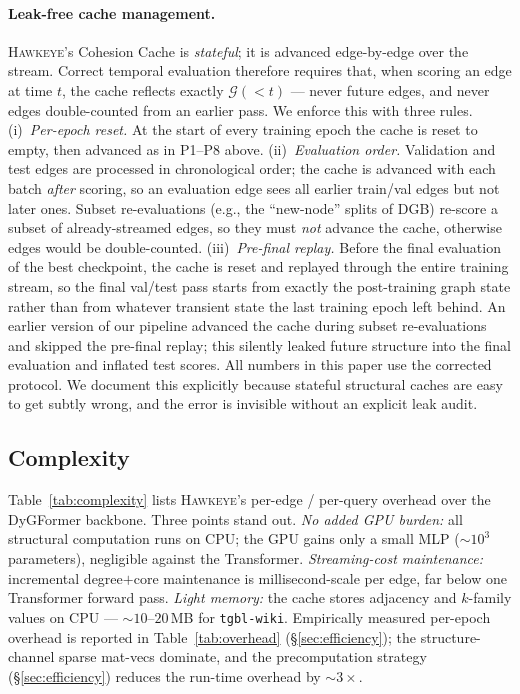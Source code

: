 \documentclass[sigconf,nonacm,review]{acmart}
\newcommand{\method}{\textsc{Hawkeye}\xspace}
\newcommand{\eg}{e.g.,\xspace}
\newcommand{\Gcal}{\mathcal{G}}
\begin{document}
\paragraph{Leak-free cache management.}
\label{sec:leakfree}
\method's Cohesion Cache is \emph{stateful}; it is advanced edge-by-edge
over the stream. Correct temporal evaluation therefore requires that, when
scoring an edge at time $t$, the cache reflects exactly $\Gcal(<t)$ --- never
future edges, and never edges double-counted from an earlier pass. We
enforce this with three rules.
(i)~\emph{Per-epoch reset.}
At the start of every training epoch the cache is reset to empty, then
advanced as in P1--P8 above.
(ii)~\emph{Evaluation order.} Validation and test edges are processed in
chronological order; the cache is advanced with each batch \emph{after}
scoring, so an evaluation edge sees all earlier train/val edges but not
later ones. Subset re-evaluations (\eg{} the ``new-node'' splits of DGB)
re-score a subset of already-streamed edges, so they must \emph{not}
advance the cache, otherwise edges would be double-counted.
(iii)~\emph{Pre-final replay.} Before the final evaluation of the best
checkpoint, the cache is reset and replayed through the entire training
stream, so the final val/test pass starts from exactly the
post-training graph state rather than from whatever transient state the
last training epoch left behind. An earlier version of our pipeline
advanced the cache during subset re-evaluations and skipped the pre-final
replay; this silently leaked future structure into the final evaluation
and inflated test scores. All numbers in this paper use the corrected
protocol. We document this explicitly because stateful structural caches
are easy to get subtly wrong, and the error is invisible without an
explicit leak audit.

\subsection{Complexity}
Table~\ref{tab:complexity} lists \method's per-edge / per-query overhead over
the DyGFormer backbone. Three points stand out. \emph{No added GPU burden:} all
structural computation runs on CPU; the GPU gains only a small MLP
($\sim\!10^3$ parameters), negligible against the Transformer.
\emph{Streaming-cost maintenance:} incremental degree$+$core maintenance is
millisecond-scale per edge, far below one Transformer forward pass.
\emph{Light memory:} the cache stores adjacency and $k$-family values on CPU
--- $\sim\!10$--$20$\,MB for \texttt{tgbl-wiki}.
Empirically measured per-epoch overhead is reported in
Table~\ref{tab:overhead} (\S\ref{sec:efficiency}); the structure-channel
sparse mat-vecs dominate, and the precomputation strategy
(\S\ref{sec:efficiency}) reduces the run-time overhead by $\sim 3\times$.
\end{document}
